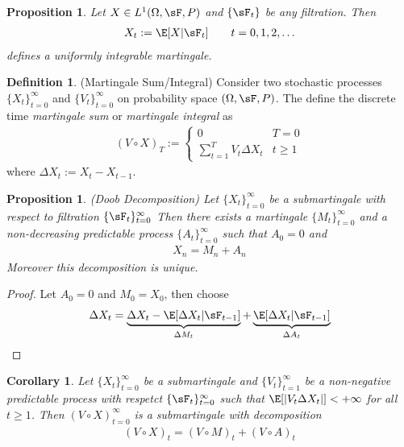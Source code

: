 \documentclass[12pt]{article}
\theoremstyle{plain}
\newtheorem{prop}[thm]{Proposition}
\newtheorem{cor}[thm]{Corollary}
\theoremstyle{definition}
\newtheorem{defn}[thm]{Definition}
\theoremstyle{remark}
\newcommand{\sumtT}{\sum^T_{t=1}}
\newcommand{\tinf}{_{t=1}^\infty}
\newcommand{\tinfz}{_{t=0}^\infty}
\begin{document}
\begin{prop}
Let $X\in L^1(\Omega,\sF,P)$ and $\{\sF_t\}$ be any filtration. Then
\begin{align*}
  X_t := \E[X|\sF_t] \qquad t=0,1,2,\ldots
\end{align*}
defines a uniformly integrable martingale.
\end{prop}


\begin{defn}(Martingale Sum/Integral)
Consider two stochastic processes $\{X_t\}\tinfz$ and $\{V_t\}\tinfz$ on
probability space $(\Omega,\sF,P)$. The define the discrete time
\emph{martingale sum} or \emph{martingale integral} as
\begin{align*}
  (V\circ X)_T
  :=
  \begin{cases}
    0 & T = 0 \\
    \sumtT V_t \Delta X_t & t \geq 1
  \end{cases}
\end{align*}
where $\Delta X_t:= X_t - X_{t-1}$.
\end{defn}

\begin{prop}\emph{(Doob Decomposition)}
Let $\{X_t\}\tinfz$ be a submartingale with respect to filtration
$\{\sF_t\}\tinfz$ Then there exists a martingale $\{M_t\}\tinfz$ and a
non-decreasing predictable process $\{A_t\}\tinfz$ such that $A_0=0$ and
\begin{align*}
  X_n = M_n + A_n
\end{align*}
Moreover this decomposition is unique.
\end{prop}
\begin{proof}
Let $A_0=0$ and $M_0=X_0$, then choose
\begin{align*}
  \Delta X_t
  = \underbrace{\Delta X_t - \E[\Delta X_t |\sF_{t-1}]}_{\Delta M_t}
  +
  \underbrace{\E[\Delta X_t |\sF_{t-1}]}_{\Delta A_t}
\end{align*}
\end{proof}


\begin{cor}
Let $\{X_t\}\tinfz$ be a submartingale and $\{V_t\}\tinf$ be a
non-negative predictable process with respetct $\{\sF_t\}\tinfz$
such that $\E[|V_t\Delta X_t|]<+\infty$ for all $t\geq 1$. Then
$(V\circ X)\tinfz$ is a submartingale with decomposition
\begin{align*}
  (V\circ X)_t =
  (V\circ M)_t +
  (V\circ A)_t
\end{align*}
\end{cor}
\end{document}
